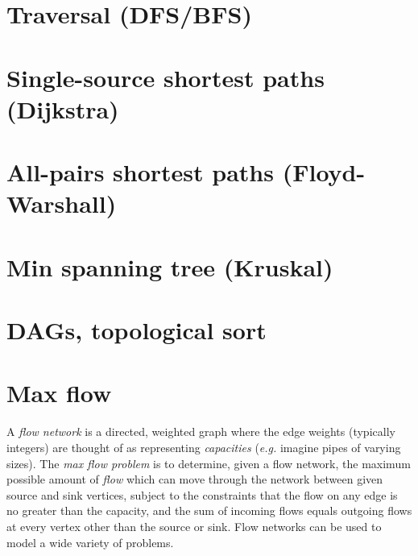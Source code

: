 \documentclass[10pt]{book}
\newif\iftodos
\newcommand{\todo}[1]{\iftodos\textcolor{red}{[TODO: #1]}\fi}
\newcommand{\eg}{\emph{e.g.}\xspace}
\begin{document}
\todo{Adjacency matrix, adjacency maps.  Edge objects. Implicit graphs.}

\section{Traversal (DFS/BFS)}

\todo{Code for DFS/BFS with level labelling, parent map.}

\section{Single-source shortest paths (Dijkstra)}

\section{All-pairs shortest paths (Floyd-Warshall)} \label{sec:floydwarshall}

\section{Min spanning tree (Kruskal)} \label{sec:kruskal}

\section{DAGs, topological sort}

\section{Max flow}

A \emph{flow network} is a directed, weighted graph where the edge
weights (typically integers) are thought of as representing
\emph{capacities} (\eg imagine pipes of varying sizes).  The \emph{max
  flow problem} is to determine, given a flow network, the maximum
possible amount of \emph{flow} which can move through the network
between given source and sink vertices, subject to the constraints
that the flow on any edge is no greater than the capacity, and the sum
of incoming flows equals outgoing flows at every vertex other than the
source or sink.  Flow networks can be used to model a wide variety of
problems.

\todo{Enumerate a few problem types: item assignment; max bipartite
  matching; min cut}

\todo{choose directed/undirected edges carefully!}

\todo{Requires vertices $0 \dots n-1$: either carefully keep track of
  which numbers are for which vertices, or use lookup tables}
\end{document}
